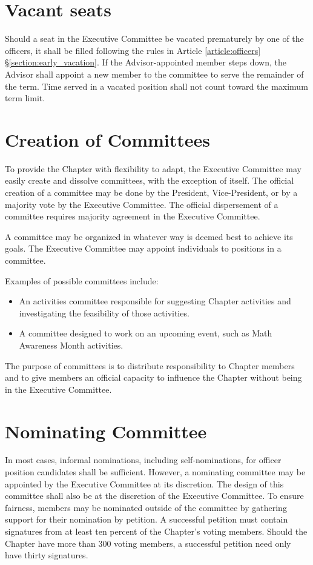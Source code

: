 \documentclass{ronr-bylaws}
\newcommand{\refsection}[2]{Article \ref{#1} \S \ref{#2}}
\begin{document}
\section{Vacant seats}
Should a seat in the Executive Committee be vacated prematurely by one of the officers,
it shall be filled following the rules in \refsection{article:officers}{section:early_vacation}. If the Advisor-appointed member steps down, the Advisor shall appoint a new member to the committee to serve the remainder of the term. Time served in a vacated position shall not count toward the maximum term limit.

\section{Creation of Committees}
To provide the Chapter with flexibility to adapt, the Executive Committee may easily
create and dissolve committees, with the exception of itself. The official creation of a committee
may be done by the President, Vice-President, or by a majority vote by the Executive Committee.
The official dispersement of a committee requires majority agreement in the Executive Committee.

A committee may be organized in whatever way is deemed best to achieve its goals. The Executive
Committee may  appoint individuals to positions in a committee.

Examples of possible committees include:
\begin{itemize}
  \item An activities committee responsible for suggesting Chapter activities and investigating the
    feasibility of those activities.
  \item A committee designed to work on an upcoming event, such as Math Awareness Month activities.
\end{itemize}

The purpose of committees is to distribute responsibility to Chapter members and to give members
an official capacity to influence the Chapter without being in the Executive Committee.

\section{Nominating Committee}
In most cases, informal nominations, including self-nominations, for officer position
candidates shall be sufficient. However, a nominating committee may be appointed by the Executive
Committee at its discretion. The design of this committee shall also be at the discretion of the
Executive Committee. To ensure fairness, members may be nominated outside of the committee by
gathering support for their nomination by petition. A successful petition must contain signatures
from at least ten percent of the Chapter's voting members. Should the Chapter have more than
300 voting members, a successful petition need only have thirty signatures.
\end{document}
